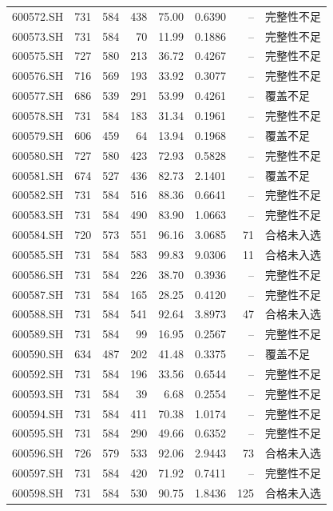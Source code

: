 \documentclass[10pt,a4paper]{article}
\begin{document}
\begin{longtable}{lrrr r r r l}
600572.SH & 731 & 584 & 438 & 75.00 & 0.6390 & -- & 完整性不足\\
600573.SH & 731 & 584 & 70 & 11.99 & 0.1886 & -- & 完整性不足\\
600575.SH & 727 & 580 & 213 & 36.72 & 0.4267 & -- & 完整性不足\\
600576.SH & 716 & 569 & 193 & 33.92 & 0.3077 & -- & 完整性不足\\
600577.SH & 686 & 539 & 291 & 53.99 & 0.4261 & -- & 覆盖不足\\
600578.SH & 731 & 584 & 183 & 31.34 & 0.1961 & -- & 完整性不足\\
600579.SH & 606 & 459 & 64 & 13.94 & 0.1968 & -- & 覆盖不足\\
600580.SH & 727 & 580 & 423 & 72.93 & 0.5828 & -- & 完整性不足\\
600581.SH & 674 & 527 & 436 & 82.73 & 2.1401 & -- & 覆盖不足\\
600582.SH & 731 & 584 & 516 & 88.36 & 0.6641 & -- & 完整性不足\\
600583.SH & 731 & 584 & 490 & 83.90 & 1.0663 & -- & 完整性不足\\
600584.SH & 720 & 573 & 551 & 96.16 & 3.0685 & 71 & 合格未入选\\
600585.SH & 731 & 584 & 583 & 99.83 & 9.0306 & 11 & 合格未入选\\
600586.SH & 731 & 584 & 226 & 38.70 & 0.3936 & -- & 完整性不足\\
600587.SH & 731 & 584 & 165 & 28.25 & 0.4120 & -- & 完整性不足\\
600588.SH & 731 & 584 & 541 & 92.64 & 3.8973 & 47 & 合格未入选\\
600589.SH & 731 & 584 & 99 & 16.95 & 0.2567 & -- & 完整性不足\\
600590.SH & 634 & 487 & 202 & 41.48 & 0.3375 & -- & 覆盖不足\\
600592.SH & 731 & 584 & 196 & 33.56 & 0.6544 & -- & 完整性不足\\
600593.SH & 731 & 584 & 39 & 6.68 & 0.2554 & -- & 完整性不足\\
600594.SH & 731 & 584 & 411 & 70.38 & 1.0174 & -- & 完整性不足\\
600595.SH & 731 & 584 & 290 & 49.66 & 0.6352 & -- & 完整性不足\\
600596.SH & 726 & 579 & 533 & 92.06 & 2.9443 & 73 & 合格未入选\\
600597.SH & 731 & 584 & 420 & 71.92 & 0.7411 & -- & 完整性不足\\
600598.SH & 731 & 584 & 530 & 90.75 & 1.8436 & 125 & 合格未入选\\

\end{longtable}
\end{document}
